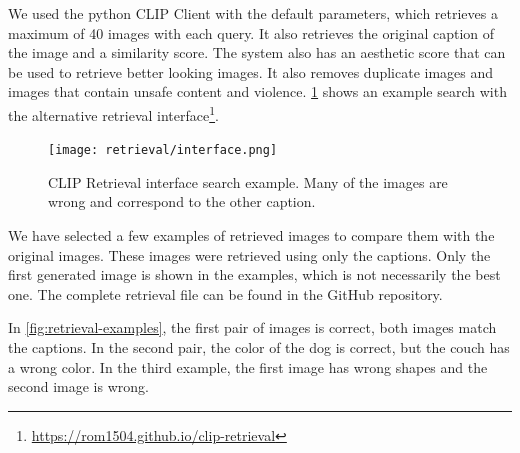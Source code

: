 We used the python CLIP Client with the default parameters, which retrieves a maximum of 40 images with each query. It also retrieves the original caption of the image and a similarity score. The system also has an aesthetic score that can be used to retrieve better looking images. It also removes duplicate images and images that contain unsafe content and violence. \cref{fig:retrieval_interface} shows an example search with the alternative retrieval interface\footnote{\url{https://rom1504.github.io/clip-retrieval}}.

\begin{figure}[ht]
    \centering
    \texttt{[image: retrieval/interface.png]}
    \caption{CLIP Retrieval interface search example. Many of the images are wrong and correspond to the other caption.}
    \label{fig:retrieval_interface}
\end{figure}

We have selected a few examples of retrieved images to compare them with the original images. These images were retrieved using only the captions. Only the first generated image is shown in the examples, which is not necessarily the best one. The complete retrieval file can be found in the GitHub repository.

In \cref{fig:retrieval-examples}, the first pair of images is correct, both images match the captions. In the second pair, the color of the dog is correct, but the couch has a wrong color. In the third example, the first image has wrong shapes and the second image is wrong.

